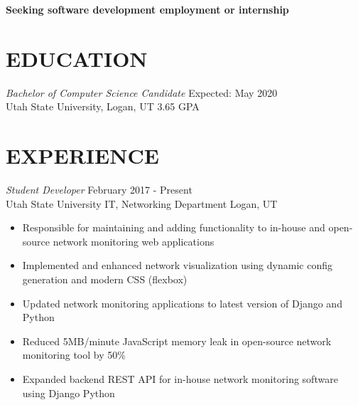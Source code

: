 \documentclass[10pt, resumewidth=7in]{res} %
\begin{document}
\centerline{\bf Seeking software development employment or internship}
\vspace{-1.0em}
\begin{resume}

%
%


\section{EDUCATION}

{\sl Bachelor of Computer Science Candidate}  \hfill Expected: May 2020 \\
Utah State University, Logan, UT \hfill 3.65 GPA



\section{EXPERIENCE}

{\sl Student Developer} \hfill February 2017 - Present \\
Utah State University IT, Networking Department \hfill Logan, UT
\begin{itemize} \itemsep -2pt %
\item Responsible for maintaining and adding functionality to in-house and open-source network monitoring web applications
\item Implemented and enhanced network visualization using dynamic config generation and modern CSS (flexbox)
\item Updated network monitoring applications to latest version of Django and Python
\item Reduced 5MB/minute JavaScript memory leak in open-source network monitoring tool by 50\%
\item Expanded backend REST API for in-house network monitoring software using Django Python
\end{itemize}


\end{resume}
\end{document}
